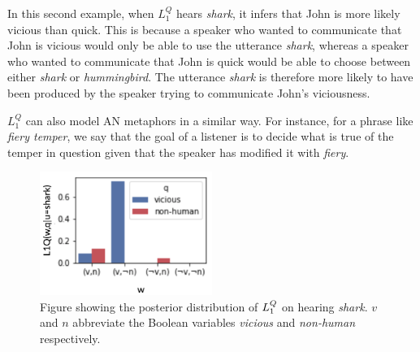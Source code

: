 \documentclass[OpenMind]{stjour}
\newcommand{\Listener}{L}
\newcommand{\QLONE}{\Listener_{{1}}^{{Q}}}
\begin{document}
	In this second example, when $\QLONE$ hears \emph{shark}, it infers that John is more likely vicious than quick. This is because a speaker who wanted to communicate that John is vicious would only be able to use the utterance \emph{shark}, whereas a speaker who wanted to communicate that John is quick would be able to choose between either \emph{shark} or \emph{hummingbird}. The utterance \emph{shark} is therefore more likely to have been produced by the speaker trying to communicate John's viciousness.

	



	
	$\QLONE$ can also model AN metaphors in a similar way. For instance, for a phrase like \emph{fiery temper}, we say that the goal of a listener is to decide what is true of the temper in question given that the speaker has modified it with \emph{fiery}.





	\begin{figure}
	\centering
	\includegraphics[width=0.5\textwidth]{images/l1posteriorquality.png}
	\caption{Figure showing the posterior distribution of $\protect\QLONE$ on hearing \emph{shark}. $v$ and $n$ abbreviate the Boolean variables \emph{vicious} and \emph{non-human} respectively.}
	\label{fig:l1barplot}
	\end{figure}
\end{document}
